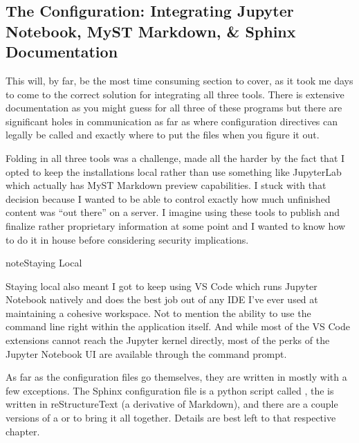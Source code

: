 \documentclass[letterpaper,12pt,english]{sphinxmanual}
\begin{document}
\subsection{The Configuration: Integrating Jupyter Notebook, MyST Markdown, \& Sphinx Documentation}
\label{\detokenize{_notebooks/00-the-goal:the-configuration-integrating-jupyter-notebook-myst-markdown-sphinx-documentation}}
\sphinxAtStartPar
This will, by far, be the most time consuming section to cover, as it took me days to come to the correct solution for integrating all three tools. There is extensive documentation \textendash{}as you might guess\textendash{} for all three of these programs but there are significant holes in communication as far as where configuration directives can legally be called and exactly where to put the files when you figure it out.

\sphinxAtStartPar
Folding in all three tools was a challenge, made all the harder by the fact that I opted to keep the installations local rather than use something like JupyterLab which actually has MyST Markdown preview capabilities. I stuck with that decision because I wanted to be able to control exactly how much unfinished content was “out there” on a server. I imagine using these tools to publish and finalize rather proprietary information at some point and I wanted to know how to do it in house before considering security implications.

\begin{sphinxadmonition}{note}{Staying Local}

\sphinxAtStartPar
Staying local also meant I got to keep using VS Code which runs Jupyter Notebook natively and does the best job out of any IDE I’ve ever used at maintaining a cohesive workspace. Not to mention the ability to use the command line right within the application itself. And while most of the VS Code extensions cannot reach the Jupyter kernel directly, most of the perks of the Jupyter Notebook UI are available through the command prompt.
\end{sphinxadmonition}

\sphinxAtStartPar
As far as the configuration files go themselves, they are written in  mostly with a few exceptions. The Sphinx configuration file is a python script called , the {\hyperref[\detokenize{index::doc}]{}} is written in reStructureText (a derivative of Markdown), and there are a couple versions of a  \textendash{}or\textendash{} to bring it all together. Details are best left to that respective chapter.
\end{document}
